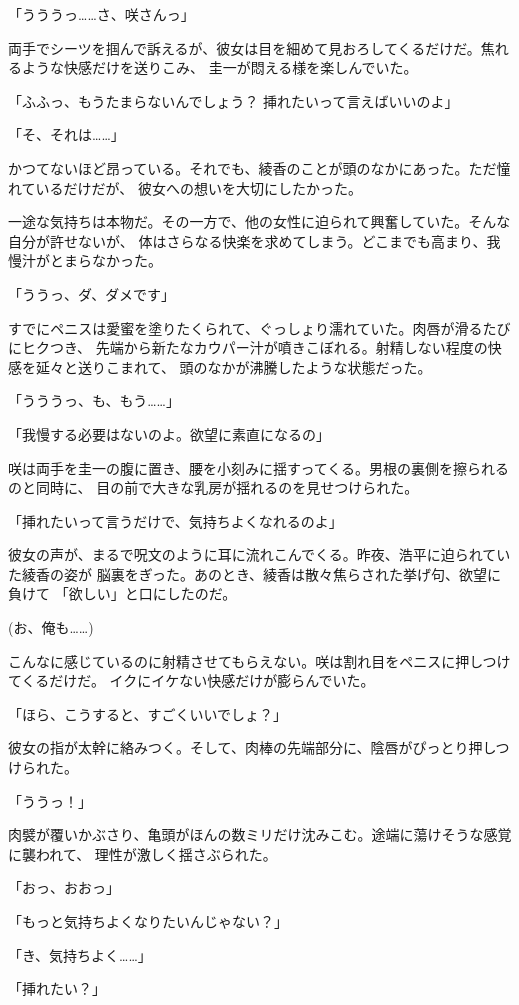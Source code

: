 ﻿\documentclass[
    book,tate,
    line_length=30zw,
    jafontsize=12pt,
    paper=b5j,
    landscape,
    ]{jlreq}
\begin{document}
「うううっ……さ、咲さんっ」

両手でシーツを掴んで訴えるが、彼女は目を細めて見おろしてくるだけだ。焦れるような快感だけを送りこみ、
圭一が悶える様を楽しんでいた。

「ふふっ、もうたまらないんでしょう？ 挿れたいって言えばいいのよ」

「そ、それは……」

かつてないほど昂っている。それでも、綾香のことが頭のなかにあった。ただ憧れているだけだが、
彼女への想いを大切にしたかった。

一途な気持ちは本物だ。その一方で、他の女性に迫られて興奮していた。そんな自分が許せないが、
体はさらなる快楽を求めてしまう。どこまでも高まり、我慢汁がとまらなかった。

「ううっ、ダ、ダメです」

すでにペニスは愛蜜を塗りたくられて、ぐっしょり濡れていた。肉唇が滑るたびにヒクつき、
先端から新たなカウパー汁が噴きこぼれる。射精しない程度の快感を延々と送りこまれて、
頭のなかが沸騰したような状態だった。

「うううっ、も、もう……」

「我慢する必要はないのよ。欲望に素直になるの」

咲は両手を圭一の腹に置き、腰を小刻みに揺すってくる。男根の裏側を擦られるのと同時に、
目の前で大きな乳房が揺れるのを見せつけられた。

「挿れたいって言うだけで、気持ちよくなれるのよ」

彼女の声が、まるで呪文のように耳に流れこんでくる。昨夜、浩平に迫られていた綾香の姿が
脳裏をぎった。あのとき、綾香は散々焦らされた挙げ句、欲望に負けて
「欲しい」と口にしたのだ。

(お、俺も……)

こんなに感じているのに射精させてもらえない。咲は割れ目をペニスに押しつけてくるだけだ。
イクにイケない快感だけが膨らんでいた。

「ほら、こうすると、すごくいいでしょ？」

彼女の指が太幹に絡みつく。そして、肉棒の先端部分に、陰唇がぴっとり押しつけられた。

「ううっ！」

肉襞が覆いかぶさり、亀頭がほんの数ミリだけ沈みこむ。途端に蕩けそうな感覚に襲われて、
理性が激しく揺さぶられた。

「おっ、おおっ」

「もっと気持ちよくなりたいんじゃない？」

「き、気持ちよく……」

「挿れたい？」
\end{document}

